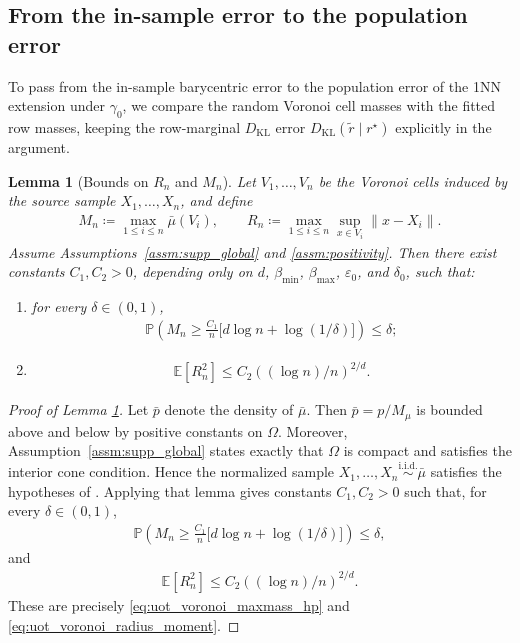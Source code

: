 \documentclass[11pt,reqno]{amsart}
\newtheorem{lemma}[theorem]{Lemma}
\theoremstyle{definition}
\newcommand{\KL}{\mathrm{KL}}
\renewcommand{\tilde}{\widetilde}
\newcommand{\Ep}{\mathbb{E}}
\renewcommand{\epsilon}{\varepsilon}
\begin{document}
\subsection{From the in-sample error to the population error}

To pass from the in-sample barycentric error to the population error of the 1NN extension under $\gamma_0$, we compare the random Voronoi cell masses with the fitted row masses, keeping the row-marginal $D_\KL$ error ${D_\KL}(\tilde r\mid r^\star)$ explicitly in the argument.



\begin{lemma}[Bounds on $R_n$ and $M_n$]
\label{lem:uot_voronoi_mass_radius}
Let $V_1,\dots,V_n$ be the Voronoi cells induced by the source sample $X_1,\dots,X_n$, and define
\begin{align*}
    M_n \coloneqq \max_{1\le i\le n} \bar\mu(V_i),
    \qquad
    R_n \coloneqq \max_{1\le i\le n}\sup_{x\in V_i}\|x-X_i\|.
\end{align*}
Assume Assumptions~\ref{assm:supp_global} and \ref{assm:positivity}. Then there exist constants $C_1,C_2>0$, depending only on $d$, $\beta_{\min}$, $\beta_{\max}$, $\epsilon_0$, and $\delta_0$, such that:
\begin{enumerate}[label=(\roman*)]
    \item for every $\delta\in(0,1)$,
    \begin{align}
\label{eq:uot_voronoi_maxmass_hp}
        \mathbb{P} \left(
            M_n
            \ge
            \frac{C_1}{n}\bigl[d\log n+\log(1/\delta)\bigr]
        \right)
        \le \delta;
    \end{align}
    \item
    \begin{align}
\label{eq:uot_voronoi_radius_moment}
        \Ep[R_n^2]
        \le
        C_2\left({(\log n)/n}\right)^{2/d}.
    \end{align}
\end{enumerate}
\end{lemma}


\begin{proof}[Proof of Lemma \ref{lem:uot_voronoi_mass_radius}]
Let $\bar p$ denote the density of $\bar\mu$.
Then $\bar p=p/M_\mu$ is bounded above and below by positive constants on $\Omega$.
Moreover, Assumption~\ref{assm:supp_global} states exactly that $\Omega$ is compact and satisfies the interior cone condition.
Hence the normalized sample $X_1,\dots,X_n\stackrel{\mathrm{i.i.d.}}{\sim}\bar\mu$ satisfies the hypotheses of \cite[Lemma~40]{manole2024plugin}.
Applying that lemma gives constants $C_1,C_2>0$ such that, for every $\delta\in(0,1)$,
\begin{align*}
    \mathbb{P}\left(
        M_n
        \ge
        \frac{C_1}{n}\bigl[d\log n+\log(1/\delta)\bigr]
    \right)
    \le
    \delta,
\end{align*}
and
\begin{align*}
    \Ep[R_n^2]
    \le
    C_2\left({(\log n)/n}\right)^{2/d}.
\end{align*}
These are precisely \eqref{eq:uot_voronoi_maxmass_hp} and \eqref{eq:uot_voronoi_radius_moment}.
\end{proof}
\end{document}
